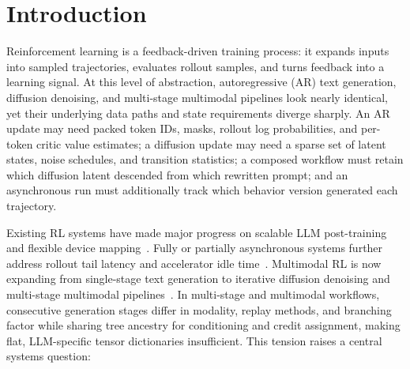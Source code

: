 \documentclass[10pt]{article}
\newcommand{\system}{UniRL\xspace}
\begin{document}
\begin{abstract}
Across three-seed training runs, SD3.5-Medium post-training improves held-out preference and compositional scores for both \system and the VeRL-Omni reference (with \ETwoDiversityChange{} and \ETwoRDiversityChange{} LPIPS diversity trade-offs); in a composed rewrite-to-image workflow, two lineage-defined groupings match an ID-joined reference on recorded rollouts and replay tensors and both improve over the base model, though their three-seed quality difference is inconclusive.
On AR math reasoning (MATH-500), prespecified GRPO peaks early before degrading across all runs, which controlled ablations trace to unregularized group-standard-deviation and sequence-length normalizations shared with veRL, whereas DRPO finishes above the base model across all three seeds and eliminates length truncation when paired with an overlong reward penalty.
\end{abstract}

\section{Introduction}
\label{sec:introduction}

Reinforcement learning is a feedback-driven training process: it expands inputs into sampled trajectories, evaluates rollout samples, and turns feedback into a learning signal.
At this level of abstraction, autoregressive (AR) text generation, diffusion denoising, and multi-stage multimodal pipelines look nearly identical, yet their underlying data paths and state requirements diverge sharply.
An AR update may need packed token IDs, masks, rollout log probabilities, and per-token critic value estimates; a diffusion update may need a sparse set of latent states, noise schedules, and transition statistics; a composed workflow must retain which diffusion latent descended from which rewritten prompt; and an asynchronous run must additionally track which behavior version generated each trajectory.

Existing RL systems have made major progress on scalable LLM post-training and flexible device mapping~\citep{sheng2024hybridflow,hu2024openrlhf,wang2025roll,nemorl2025}.
Fully or partially asynchronous systems further address rollout tail latency and accelerator idle time~\citep{fu2025areal,zhang2026relax,slime2025}.
Multimodal RL is now expanding from single-stage text generation to iterative diffusion denoising and multi-stage multimodal pipelines~\citep{black2023ddpo,liu2025flowgrpo,xue2025dancegrpo,zheng2025diffusionnft,verlomni2026}.
In multi-stage and multimodal workflows, consecutive generation stages differ in modality, replay methods, and branching factor while sharing tree ancestry for conditioning and credit assignment, making flat, LLM-specific tensor dictionaries insufficient.
This tension raises a central systems question:
\end{document}

